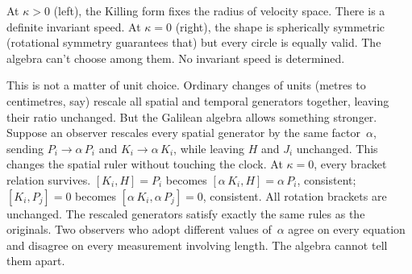\documentclass[11pt]{article}
\begin{document}
\begin{center}
\end{center}

\noindent At $\kappa > 0$ (left), the Killing form fixes the radius of velocity space. There is a definite invariant speed. At $\kappa = 0$ (right), the shape is spherically symmetric (rotational symmetry guarantees that) but every circle is equally valid. The algebra can't choose among them. No invariant speed is determined.

This is not a matter of unit choice. Ordinary changes of units (metres to centimetres, say) rescale all spatial and temporal generators together, leaving their ratio unchanged. But the Galilean algebra allows something stronger. Suppose an observer rescales every spatial generator by the same factor~$\alpha$, sending $P_i \to \alpha\,P_i$ and $K_i \to \alpha\,K_i$, while leaving $H$ and $J_i$ unchanged. This changes the spatial ruler without touching the clock. At $\kappa = 0$, every bracket relation survives. $[K_i, H] = P_i$ becomes $[\alpha\,K_i, H] = \alpha\,P_i$, consistent; $[K_i, P_j] = 0$ becomes $[\alpha\,K_i, \alpha\,P_j] = 0$, consistent. All rotation brackets are unchanged. The rescaled generators satisfy exactly the same rules as the originals. Two observers who adopt different values of~$\alpha$ agree on every equation and disagree on every measurement involving length. The algebra cannot tell them apart.
\end{document}
